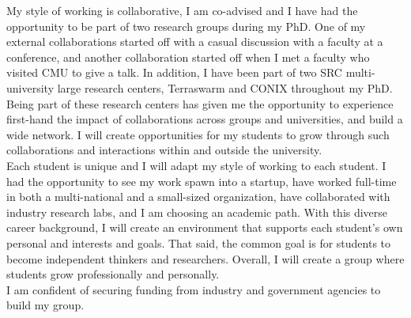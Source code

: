\documentclass[10pt]{article}
\begin{document}
My style of working is collaborative, I am co-advised and I have had the opportunity to be part of two research groups during my PhD. One of my external collaborations started off with a casual discussion with a faculty at a conference, and another collaboration started off when I met a faculty who visited CMU to give a talk. %
In addition, I have been part of two SRC multi-university large research centers, Terraswarm and CONIX throughout my PhD. Being part of these research centers has given me the opportunity to experience first-hand the impact of collaborations across groups and universities, and build a wide network. I will create opportunities for my students to grow through such collaborations and interactions within and outside the university.  \\

Each student is unique and I will adapt my style of working to each student. %
I had the opportunity to see my work spawn into a startup, have worked full-time in both a multi-national and a small-sized organization, have collaborated with industry research labs, and I am choosing an academic path. With this diverse career background, I will create an environment that supports each student's own personal and interests and goals. That said, the common goal is for students to become independent thinkers and researchers. %
 Overall, I will create a group where students grow professionally and personally.\\

I am confident of securing funding from industry and government agencies to build my group.



\footnotesize


\end{document}

